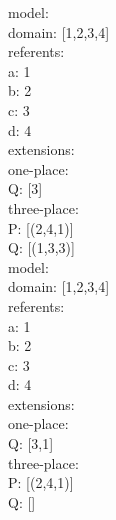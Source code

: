 \documentclass[12pt,a4paper]{article}
\begin{document}
\noindent
model:\\
\hspace*{1em}  domain: [1,2,3,4]\\
\hspace*{1em}  referents: \\
\hspace*{3em} a: 1 \\
\hspace*{3em} b: 2 \\
\hspace*{3em} c: 3 \\
\hspace*{3em} d: 4\\
\hspace*{1em}  extensions:\\
\hspace*{2em}    one-place: \\
\hspace*{4em} Q: [3]\\
\hspace*{2em}    three-place: \\
\hspace*{4em} P: [(2,4,1)]\\
\hspace*{4em} Q: [(1,3,3)]\\

\noindent
model:\\
\hspace*{1em}  domain: [1,2,3,4]\\
\hspace*{1em}  referents: \\
\hspace*{3em} a: 1 \\
\hspace*{3em} b: 2 \\
\hspace*{3em} c: 3 \\
\hspace*{3em} d: 4\\
\hspace*{1em}  extensions:\\
\hspace*{2em}    one-place: \\
\hspace*{4em} Q: [3,1]\\
\hspace*{2em}    three-place: \\
\hspace*{4em} P: [(2,4,1)]\\
\hspace*{4em} Q: []\\
\end{document}
